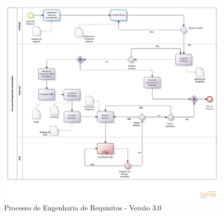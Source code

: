 \pagebreak
\begin{figure}[!htb]
\flushleft
\includegraphics[scale=0.6]{figuras/processo3.png}
\caption{Processo de Engenharia de Requisitos - Versão 3.0}
\label{fig:Processo}
\end{figure}



